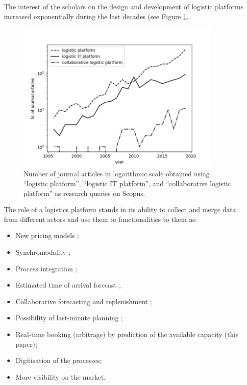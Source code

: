 The interest of the scholars on the design and development of logistic platforms increased exponentially during the last decades (see Figure \ref{fig_literatureTrend}.


\begin{figure}[hbt!]
\centering
\includegraphics[width=0.9\textwidth]{SectionDistribution/control_figures/fig_literatureTrend.png}
\captionsetup{type=figure}
\caption{Number of journal articles in logarithmic scale obtained using “logistic platform”, “logistic IT platform”, and “collaborative logistic platform” as research queries on Scopus.}
\label{fig_literatureTrend}
\end{figure}

The role of a logistics platform stands in its ability to collect and merge data from different actors and use them to functionalities to them as:

\begin{itemize}
    \item New pricing models \cite{Figliozzi2005, Lindsey2014,Tibben-Lembke2006};
    \item Synchromodality \cite{Giusti2019};
    \item Process integration \cite{Mason2006};
    \item Estimated time of arrival forecast \cite{Pani2014};
    \item Collaborative forecasting and replenishment \cite{Feng2017};
    \item Possibility of last-minute planning \cite{Mulder2019};
    \item Real-time booking (arbitrage) by prediction of the available capacity (this paper);
    \item Digitisation of the processes;
    \item More visibility on the market.

\end{itemize}

